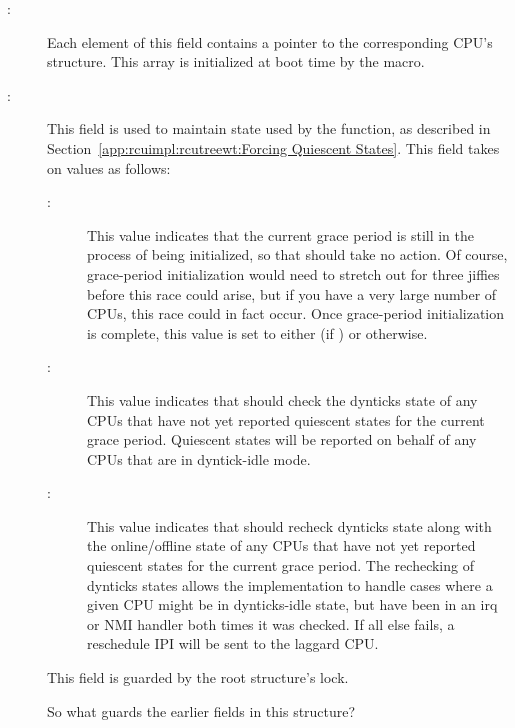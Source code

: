 \begin{description}
\item[:]
	Each element of this field contains a pointer to the
	corresponding CPU's  structure.
	This array is initialized at boot time by the
	 macro.
\item[:]
	This field is used to maintain state used by the
	 function, as described in
	Section~\ref{app:rcuimpl:rcutreewt:Forcing Quiescent States}.
	This field takes on values as follows:
	\begin{description}
	\item[:]
		This value indicates that the current grace period
		is still in the process of being initialized,
		so that  should take
		no action.
		Of course, grace-period initialization would need
		to stretch out for three jiffies before this race
		could arise, but if you have a very large number
		of CPUs, this race could in fact occur.
		Once grace-period initialization is complete,
		this value is set to either 
		(if ) or  otherwise.
	\item[:]
		This value indicates that 
		should check the dynticks state of any CPUs that have
		not yet reported quiescent states for the current
		grace period.
		Quiescent states will be reported on behalf of any
		CPUs that are in dyntick-idle mode.
	\item[:]
		This value indicates that 
		should recheck dynticks state along with the online/offline
		state of any CPUs that have
		not yet reported quiescent states for the current
		grace period.
		The rechecking of dynticks states allows the implementation
		to handle cases where a given CPU might be in dynticks-idle
		state, but have been in an irq or NMI handler both
		times it was checked.
		If all else fails, a reschedule IPI will be sent to
		the laggard CPU.
	\end{description}
	This field is guarded by the root  structure's lock.

\QuickQuiz{}
	So what guards the earlier fields in this structure?
 \QuickQuizEnd


\end{description}
